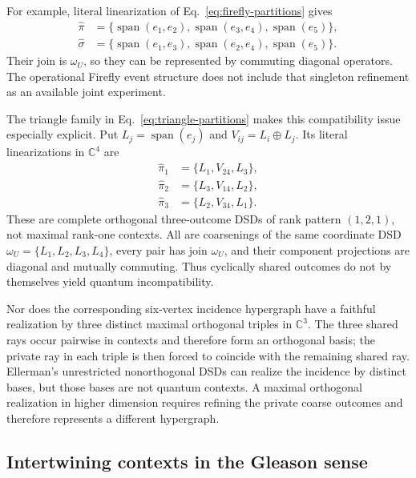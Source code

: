 \documentclass[aps,pra,reprint,nofootinbib]{revtex4-2}
\newcommand{\Span}{\operatorname{span}}
\begin{document}
For example, literal linearization of Eq.~\eqref{eq:firefly-partitions} gives
\begin{align}
  \widehat\pi
  &=\{\Span(e_1,e_2),\Span(e_3,e_4),\Span(e_5)\},\\
  \widehat\sigma
  &=\{\Span(e_1,e_3),\Span(e_2,e_4),\Span(e_5)\}.
\end{align}
Their join is $\omega_U$, so they can be represented by commuting diagonal
operators.  The operational Firefly event structure does not include that
singleton refinement as an available joint experiment.

The triangle family in Eq.~\eqref{eq:triangle-partitions} makes this
compatibility issue especially explicit.  Put $L_j=\Span(e_j)$ and
$V_{ij}=L_i\oplus L_j$.  Its literal linearizations in $\mathbb C^4$ are
\begin{equation}
  \begin{aligned}
  \widehat\pi_1&=\{L_1,V_{24},L_3\},\\
  \widehat\pi_2&=\{L_3,V_{14},L_2\},\\
  \widehat\pi_3&=\{L_2,V_{34},L_1\}.
  \end{aligned}
  \label{eq:triangle-linearizations}
\end{equation}
These are complete orthogonal three-outcome DSDs of rank pattern $(1,2,1)$,
not maximal rank-one contexts.  All are coarsenings of the same coordinate DSD
$\omega_U=\{L_1,L_2,L_3,L_4\}$, every pair has join $\omega_U$, and their
component projections are diagonal and mutually commuting.  Thus cyclically shared outcomes do not
by themselves yield quantum incompatibility.

Nor does the corresponding six-vertex incidence hypergraph have a faithful
realization by three distinct maximal orthogonal triples in $\mathbb C^3$.
The three shared rays occur pairwise in contexts and therefore form an
orthogonal basis; the private ray in each triple is then forced to coincide
with the remaining shared ray.  Ellerman's unrestricted nonorthogonal DSDs can
realize the incidence by distinct bases, but those bases are not quantum
contexts.  A maximal orthogonal realization in higher dimension requires
refining the private coarse outcomes and therefore represents a different
hypergraph.

\subsection{Intertwining contexts in the Gleason sense}
\end{document}
